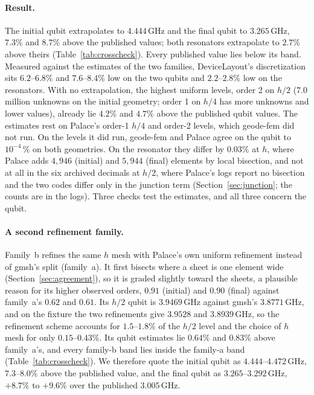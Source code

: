\documentclass{anvil-paper}
\begin{document}
\paragraph{Result.}
The initial qubit extrapolates to $4.444$\,GHz and the final qubit to
$3.265$\,GHz, $7.3\%$ and $8.7\%$ above the published values; both
resonators extrapolate to $2.7\%$ above theirs
(Table~\ref{tab:crosscheck}). Every published value lies below its band.
Measured against the estimates of the two families, DeviceLayout's
discretization sits $6.2$--$6.8\%$ and $7.6$--$8.4\%$ low on the two qubits
and $2.2$--$2.8\%$ low on the resonators. With no extrapolation, the
highest uniform levels, order 2 on $h/2$ ($7.0$ million unknowns on the
initial geometry; order 1 on $h/4$ has more unknowns and lower values),
already lie $4.2\%$ and $4.7\%$ above the published qubit values. The
estimates rest on Palace's order-1 $h/4$ and order-2 levels, which
geode-fem did not run. On the levels it did run, geode-fem and Palace
agree on the qubit to $10^{-4}\,\%$ on both geometries. On the resonator
they differ by $0.03\%$ at $h$, where Palace adds $4{,}946$ (initial) and
$5{,}944$ (final) elements by local bisection, and not at all in the six
archived decimals at $h/2$, where Palace's logs report no bisection and
the two codes differ only in the junction term
(Section~\ref{sec:junction}; the counts are in the logs). Three checks
test the estimates, and all three concern the qubit.

\paragraph{A second refinement family.}
Family~b refines the same $h$ mesh with Palace's own uniform refinement
instead of gmsh's split (family~a). It first bisects where a sheet is one
element wide (Section~\ref{sec:agreement}), so it is graded slightly
toward the sheets, a plausible reason for its higher observed orders,
$0.91$ (initial) and $0.90$ (final) against family~a's $0.62$ and $0.61$.
Its $h/2$ qubit is $3.9469$\,GHz against gmsh's $3.8771$\,GHz, and on the
fixture the two refinements give $3.9528$ and $3.8939$\,GHz, so the
refinement scheme accounts for $1.5$--$1.8\%$ of the $h/2$ level and the
choice of $h$ mesh for only $0.15$--$0.43\%$. Its qubit estimates lie
$0.64\%$ and $0.83\%$ above family~a's, and every family-b band lies
inside the family-a band (Table~\ref{tab:crosscheck}). We therefore quote
the initial qubit as $4.444$--$4.472$\,GHz, $7.3$--$8.0\%$ above the
published value, and the final qubit as $3.265$--$3.292$\,GHz, $+8.7\%$ to
$+9.6\%$ over the published $3.005$\,GHz.
\end{document}
